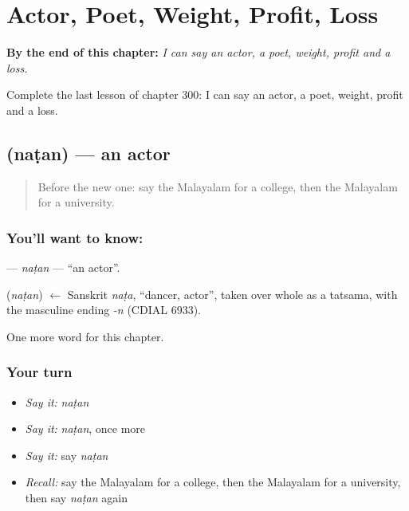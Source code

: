 
\chapter{Actor, Poet, Weight, Profit, Loss}
\label{ch:ml-actor-poet-weight-profit-loss}

\begin{chapteropening}
\textbf{By the end of this chapter:} \emph{I can say an actor, a poet, weight, profit and a loss.}

Complete the last lesson of chapter 300: I can say an actor, a poet, weight, profit and a loss.
\end{chapteropening}

\section[\texorpdfstring{\ml{നടൻ} (naṭan)}{നടൻ (naṭan)}]{ (naṭan) — an actor}

\label{lesson:ML-C300-natan}



\begin{quote}
Before the new one: say the Malayalam for a college, then the Malayalam for a university.
\end{quote}

\subsection*{You'll want to know: }
\textbf{} — \emph{naṭan} — \textquotedblleft{}an actor\textquotedblright{}.

\begin{cousinweb}
\textbf{} (\emph{naṭan}) $\leftarrow$ Sanskrit \emph{naṭa}, \textquotedblleft{}dancer, actor\textquotedblright{}, taken over whole as a tatsama, with the masculine ending \emph{-n} (CDIAL 6933).
\end{cousinweb}

\begin{grammarlens}[title={What you've built}]
One more word for this chapter.
\end{grammarlens}

\subsection*{Your turn}
\begin{itemize}
\raggedright
  \item \emph{Say it:} \emph{naṭan}
  \item \emph{Say it:} \emph{naṭan}, once more
  \item \emph{Say it:} say \emph{naṭan}
  \item \emph{Recall:} say the Malayalam for a college, then the Malayalam for a university, then say \emph{naṭan} again
\end{itemize}

